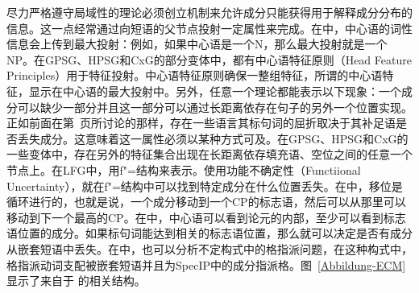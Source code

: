 尽力严格遵守局域性的理论必须创立机制来允许成分只能获得用于解释成分分布的信息。这一点经常通过向短语的父节点投射一定属性来完成。在\xbartc 中，中心语的词性信息会上传到最大投射：例如，如果中心语是一个N，那么最大投射就是一个NP。在GPSG、HPSG和CxG的部分变体中，都有中心语特征原则（Head Feature Principles）用于特征投射。中心语特征原则确保一整组特征，所谓的中心语特征，显示在中心语的最大投射中。另外，任意一个理论都能表示以下现象：一个成分可以缺少一部分并且这一部分可以通过长距离依存在句子的另外一个位置实现。正如前面在第~\pageref{page-Irish-complementizers}页所讨论的那样，存在一些语言其标句词的屈折取决于其补足语是否丢失成分。这意味着这一属性必须以某种方式可及。在GPSG、HPSG和CxG的一些变体中，存在另外的特征集合出现在长距离依存填充语、空位之间的任意一个节点上。在LFG中，用f"=结构来表示。使用功能不确定性（Functiional Uncertainty），就在f"=结构中可以找到特定成分在什么位置丢失。在\gbtc 中，移位是循环进行的，也就是说，一个成分移动到一个CP的标志语，然后可以从那里可以移动到下一个最高的CP。在\gbtc 中，中心语可以看到论元的内部，至少可以看到标志语位置的成分。如果标句词能达到相关的标志语位置，那么就可以决定是否有成分从嵌套短语中丢失。在\gbtc 中，也可以分析不定构式中的格指派问题，在这种构式中，格指派动词支配被嵌套短语并且为\mbox{SpecIP}中的成分指派格。图~\ref{Abbildung-ECM}显示了来自于 的相关结构。
